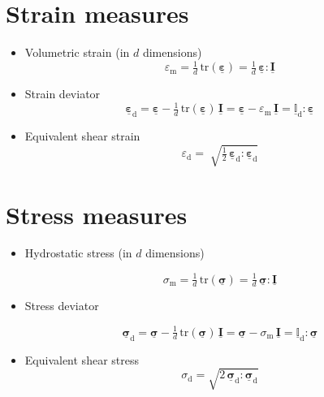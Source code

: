 \documentclass[namecite, fleqn]{goose-article}
\newcommand\T[1]{\underline{\bm{{#1}}}}
\newcommand\TT[1]{\underline{\mathbb{{#1}}}}
\begin{document}
\section{Strain measures}
\label{sec:nomenclature::strain}

\begin{itemize}

    \item Volumetric strain (in $d$ dimensions)
    \begin{equation}
        \varepsilon_\mathrm{m}
        = \tfrac{1}{d} \, \mathrm{tr} ( \T{\varepsilon} )
        = \tfrac{1}{d} \, \T{\varepsilon} : \T{I}
    \end{equation}

    \item Strain deviator
    \begin{equation}
        \T{\varepsilon}_\mathrm{d}
        = \T{\varepsilon} - \tfrac{1}{d} \, \mathrm{tr} ( \T{\varepsilon} ) \, \T{I}
        = \T{\varepsilon} - \varepsilon_\mathrm{m} \, \T{I}
        = \TT{I}_\mathrm{d} : \T{\varepsilon}
    \end{equation}

    \item Equivalent shear strain
    \begin{equation}
        \varepsilon_\mathrm{d}
        = \; \sqrt{
          \tfrac{1}{2} \, \T{\varepsilon}_\mathrm{d} : \T{\varepsilon}_\mathrm{d}
        }
    \end{equation}

\end{itemize}

\section{Stress measures}
\label{sec:nomenclature::stress}

\begin{itemize}

    \item Hydrostatic stress (in $d$ dimensions)

    \begin{equation}
        \sigma_\mathrm{m}
        = \tfrac{1}{d} \, \mathrm{tr} ( \T{\sigma} )
        = \tfrac{1}{d} \, \T{\sigma} : \T{I}
    \end{equation}

    \item Stress deviator

    \begin{equation}
        \T{\sigma}_\mathrm{d}
        = \T{\sigma} - \tfrac{1}{d} \, \mathrm{tr} ( \T{\sigma} ) \, \T{I}
        = \T{\sigma} - \sigma_\mathrm{m} \, \T{I}
        = \TT{I}_\mathrm{d} : \T{\sigma}
    \end{equation}

    \item Equivalent shear stress
    \begin{equation}
        \sigma_\mathrm{d} = \sqrt{ 2 \, \T{\sigma}_\mathrm{d} : \T{\sigma}_\mathrm{d} }
    \end{equation}

\end{itemize}
\end{document}

